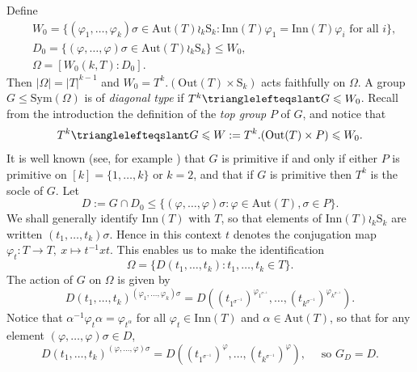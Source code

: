 \documentclass[twoside,a4paper,reqno,11pt]{amsart}
\renewcommand{\a}{\alpha}
\newcommand{\normeq}{\trianglelefteqslant}
\newcommand{\<}{\langle}
\renewcommand{\>}{\rangle}
\newcommand{\leqs}{\leqslant}
\newcommand{\Aut}{\mathrm{Aut}}
\newcommand{\Inn}{\mathrm{Inn}}
\newcommand{\Out}{\mathrm{Out}}
\newcommand{\Sn}{\mathrm{S}}
\theoremstyle{definition}
\begin{document}
Define 
\begin{equation*}
\begin{aligned}
&W_0 =\{(\varphi_1,\dots,\varphi_k)\sigma\in \Aut(T)\wr_k \Sn_k: \Inn(T)\varphi_1 = \Inn(T)\varphi_i \mbox{ for all }i\},\\
&D_0 =\{(\varphi,\dots,\varphi)\sigma\in \Aut(T)\wr_k \Sn_k\} \leqs W_0,\\
&\Omega =[W_0(k,T):D_0].
\end{aligned}
\end{equation*}
Then $|\Omega| = |T|^{k-1}$ and $W_0 = T^k.(\Out(T)\times  \Sn_k)$ acts faithfully on $\Omega$. A group $G\leqs\mathrm{Sym}(\Omega)$ is of \textit{diagonal type} if
$T^k\normeq G\leqs W_0$.
Recall from the introduction the definition of the \emph{top group} $P$ of $G$, and notice that
\begin{equation}\label{e:diag}
T^k\normeq G\leqs W:= T^k.(\Out(T)\times P) \leqs W_0.
\end{equation}
It is well known (see, for example \cite[Theorem 4.5A]{DixonMortimer}) that $G$ is primitive if and only if either $P$ is primitive on $[k] = \{1,\dots,k\}$ or $k = 2$, and that if $G$ is primitive then $T^k$ is the socle of $G$. Let
\begin{equation*}
D:=G \cap D_0 \leqs  \{(\varphi,\dots,\varphi)\sigma:\varphi\in\Aut(T),\sigma\in P\}.
\end{equation*}
We shall generally identify $\Inn(T)$ with $T$, so that elements of $\Inn(T) \wr_k \Sn_k$ are written $(t_1, \ldots, t_k) \sigma$. Hence in this context $t$ denotes  the conjugation map $\varphi_t: T \rightarrow T, \ x \mapsto t^{-1} x t$. This enables us to make the identification
\begin{equation*}
\Omega = \{D(t_1,\dots,t_k):t_1,\dots,t_k\in T\}.
\end{equation*}
The action of $G$ on $\Omega$ is given by
\begin{equation*}
D(t_1,\dots,t_k)^{(\varphi_1,\dots,\varphi_k)\sigma} = D((t_{1^{\sigma^{-1}}})^{\varphi_{1^{\sigma^{-1}}}},\dots,(t_{k^{\sigma^{-1}}})^{\varphi_{k^{\sigma^{-1}}}}).
\end{equation*}
Notice that $ \a^{-1}\varphi_t\a = \varphi_{t^\a}$ for all $\varphi_t\in \Inn(T)$ and $\a \in \Aut(T)$,
so that for any element $(\varphi,\dots,\varphi)\sigma\in D$, 
\begin{equation}\label{e:GD}
D(t_1,\dots,t_k)^{(\varphi,\dots,\varphi)\sigma} = D((t_{1^{\sigma^{-1}}})^{\varphi},\dots,(t_{k^{\sigma^{-1}}})^{\varphi}), \quad \mbox{ so } G_D = D. 
\end{equation}
\end{document}
